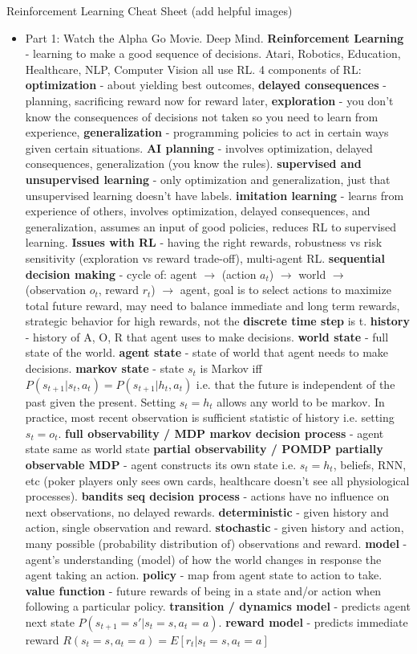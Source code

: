 \documentclass{article}
\begin{document}
Reinforcement Learning Cheat Sheet (add helpful images)
\iffalse \tiny \fi
\begin{itemize}
\item Part 1: Watch the Alpha Go Movie. Deep Mind. \textbf{Reinforcement Learning} - learning to make a good sequence of decisions. Atari, Robotics, Education, Healthcare, NLP, Computer Vision all use RL. 4 components of RL: \textbf{optimization} - about yielding best outcomes, \textbf{delayed consequences} - planning, sacrificing reward now for reward later, \textbf{exploration} - you don't know the consequences of decisions not taken so you need to learn from experience, \textbf{generalization} - programming policies to act in certain ways given certain situations. \textbf{AI planning} - involves optimization, delayed consequences, generalization (you know the rules). \textbf{supervised and unsupervised learning} - only optimization and generalization, just that unsupervised learning doesn't have labels. \textbf{imitation learning} - learns from experience of others, involves optimization, delayed consequences, and generalization, assumes an input of good policies, reduces RL to supervised learning. \textbf{Issues with RL} - having the right rewards, robustness vs risk sensitivity (exploration vs reward trade-off), multi-agent RL.  \textbf{sequential decision making} - cycle of: agent $\rightarrow$ (action $a_t$) $\rightarrow$ world $\rightarrow$ (observation $o_t$, reward $r_t$) $\rightarrow$ agent, goal is to select actions to maximize total future reward, may need to balance immediate and long term rewards, strategic behavior for high rewards, not the \textbf{discrete time step} is t. \textbf{history} - history of A, O, R that agent uses to make decisions. \textbf{world state} - full state of the world. \textbf{agent state} - state of world that agent needs to make decisions. \textbf{markov state} - state $s_t$ is Markov iff $P(s_{t+1} | s_t, a_t) = P(s_{t+1} | h_t, a_t)$ i.e. that the future is independent of the past given the present. Setting $s_t = h_t$ allows any world to be markov. In practice, most recent observation is sufficient statistic of history i.e. setting $s_t = o_t$. \textbf{full observability / MDP markov decision process} - agent state same as world state \textbf{partial observability / POMDP partially observable MDP} - agent constructs its own state i.e. $s_t = h_t$, beliefs, RNN, etc (poker players only sees own cards, healthcare doesn't see all physiological processes). \textbf{bandits seq decision process} - actions have no influence on next observations, no delayed rewards. \textbf{deterministic} - given history and action, single observation and reward. \textbf{stochastic} - given history and action, many possible (probability distribution of) observations and reward. \textbf{model} - agent's understanding (model) of how the world changes in response the agent taking an action. \textbf{policy} - map from agent state to action to take. \textbf{value function} - future rewards of being in a state and/or action when following a particular policy. \textbf{transition / dynamics model} - predicts agent next state $P(s_{t+1}=s' | s_t=s, a_t=a)$. \textbf{reward model} - predicts immediate reward $R(s_t=s, a_t=a) = E[r_t | s_t=s, a_t=a]$ 
\end{itemize}
\end{document}
